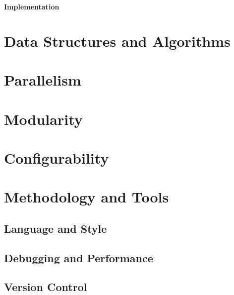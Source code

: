 \documentclass{article}
\begin{document}
\begin{center}{\bf \LARGE Implementation}\end{center}

\tableofcontents

\section{Data Structures and Algorithms}

\section{Parallelism}

\section{Modularity}

\section{Configurability}

\section{Methodology and Tools}

\subsection{Language and Style}

\subsection{Debugging and Performance}

\subsection{Version Control}

\end{document}
